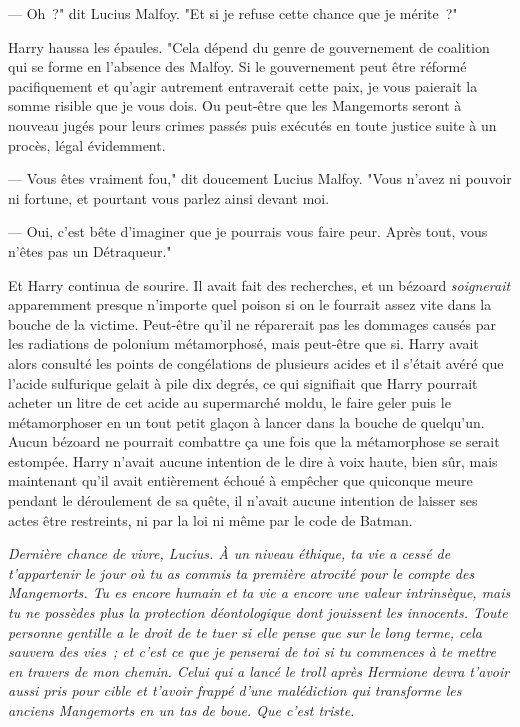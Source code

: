 --- Oh~?" dit Lucius Malfoy. "Et si je refuse cette chance que je mérite~?"

Harry haussa les épaules. "Cela dépend du genre de gouvernement de coalition qui se forme en l'absence des Malfoy. Si le gouvernement peut être réformé pacifiquement et qu'agir autrement entraverait cette paix, je vous paierait la somme risible que je vous dois. Ou peut-être que les Mangemorts seront à nouveau jugés pour leurs crimes passés puis exécutés en toute justice suite à un procès, légal évidemment.

--- Vous êtes vraiment fou," dit doucement Lucius Malfoy. "Vous n'avez ni pouvoir ni fortune, et pourtant vous parlez ainsi devant moi.

--- Oui, c'est bête d'imaginer que je pourrais vous faire peur. Après tout, vous n'êtes pas un Détraqueur."

Et Harry continua de sourire. Il avait fait des recherches, et un bézoard \emph{soignerait} apparemment presque n'importe quel poison si on le fourrait assez vite dans la bouche de la victime. Peut-être qu'il ne réparerait pas les dommages causés par les radiations de polonium métamorphosé, mais peut-être que si. Harry avait alors consulté les points de congélations de plusieurs acides et il s'était avéré que l'acide sulfurique gelait à pile dix degrés, ce qui signifiait que Harry pourrait acheter un litre de cet acide au supermarché moldu, le faire geler puis le métamorphoser en un tout petit glaçon à lancer dans la bouche de quelqu'un. Aucun bézoard ne pourrait combattre ça une fois que la métamorphose se serait estompée. Harry n'avait aucune intention de le dire à voix haute, bien sûr, mais maintenant qu'il avait entièrement échoué à empêcher que quiconque meure pendant le déroulement de sa quête, il n'avait aucune intention de laisser ses actes être restreints, ni par la loi ni même par le code de Batman.

\emph{Dernière chance de vivre, Lucius. À un niveau éthique, ta vie a cessé de t'appartenir le jour où tu as commis ta première atrocité pour le compte des Mangemorts. Tu es encore humain et ta vie a encore une valeur intrinsèque, mais tu ne possèdes plus la protection déontologique dont jouissent les innocents. Toute personne gentille a le droit de te tuer si elle pense que sur le long terme, cela sauvera des vies~; et c'est ce que je penserai de toi si tu commences à te mettre en travers de mon chemin. Celui qui a lancé le troll après Hermione devra t'avoir aussi pris pour cible et t'avoir frappé d'une malédiction qui transforme les anciens Mangemorts en un tas de boue. Que c'est triste.}

